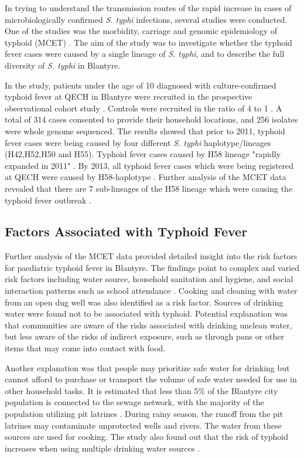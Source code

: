 In trying to understand the transmission routes of the rapid increase in cases of microbiologically confirmed \textit{S. typhi} infections, several studies were conducted. One of the studies was the morbidity, carriage and genomic epidemiology of typhoid (MCET) \citep{Feasey:2015}. The aim of the study was to investigate whether the typhoid fever cases were caused by a single lineage of \textit{S. typhi}, and to describe the full diversity of \textit{S. typhi} in Blantyre.

In the study, patients under the age of 10 diagnosed with culture-confirmed typhoid fever at QECH in Blantyre were recruited in the prospective observational cohort study \citep{Feasey:2015}. Controls were recruited in the ratio of 4 to 1 \citep{Gauld:2020}. A total of 314 cases consented to provide their household locations, and 256 isolates were whole genome sequenced. The results showed that prior to 2011, typhoid fever cases were being caused by four different \textit{S. typhi} haplotype/lineages (H42,H52,H50 and H55). Typhoid fever cases caused by H58 lineage "rapidly expanded in 2011" \citep{Feasey:2015}. By 2013, all typhoid fever cases which were being registered at QECH were caused by H58-haplotype \citep{Feasey:2015}. Further analysis of the MCET data revealed that there are 7 sub-lineages of the H58 lineage which were causing the typhoid fever outbreak \citep{Wailan:2019}.

\subsection{Factors Associated with Typhoid Fever}

Further analysis of the MCET data provided detailed insight into the risk factors for paediatric typhoid fever in Blantyre. The findings point to complex and varied risk factors including water source, household sanitation and hygiene, and social interaction patterns such as school attendance \citep{Gauld:2020}. Cooking and cleaning with water from an open dug well was also identified as a risk factor. Sources of drinking water were found not to be associated with typhoid. Potential explanation was that communities are aware of the risks associated with drinking unclean water, but less aware of the risks of indirect exposure, such as through pans or other items that may come into contact with food.

Another explanation was that people may prioritize safe water for drinking but cannot afford to purchase or transport the volume of safe water needed for use in other household tasks. It is estimated that less than 5\% of the Blantyre city population is connected to the sewage network, with the majority of the population utilizing pit latrines \citep{Gauld:2020}. During rainy season, the runoff from the pit latrines may contaminate unprotected wells and rivers. The water from these sources are used for cooking. The study also found out that the risk of typhoid increases when using multiple drinking water sources \citep{Gauld:2020}.

